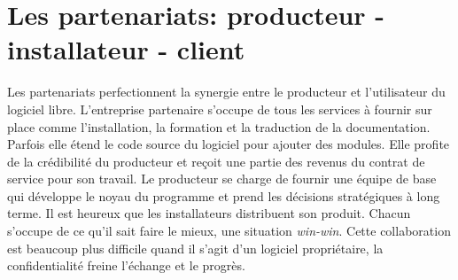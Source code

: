 \documentclass[10pt]{../fiche}
\begin{document}
\section*{Les partenariats: producteur - installateur - client} %
Les partenariats perfectionnent la synergie entre le producteur et l'utilisateur du logiciel
libre. L'entreprise partenaire s'occupe de tous les services à fournir sur place comme l'installation, la formation et
la traduction de la documentation. Parfois elle étend le code source du logiciel pour ajouter des modules.
Elle profite de la crédibilité du producteur et reçoit une partie des revenus du contrat de service pour son travail.
Le producteur se charge de fournir une équipe de base qui développe le noyau du programme et
prend les décisions stratégiques à long terme. Il est heureux que les installateurs
distribuent son produit. Chacun s'occupe de ce qu'il sait %
faire le mieux, une situation \textit{win-win}.
Cette collaboration est beaucoup plus difficile
quand il s'agit d'un logiciel propriétaire, la confidentialité freine l'échange et le progrès.
\end{document}
